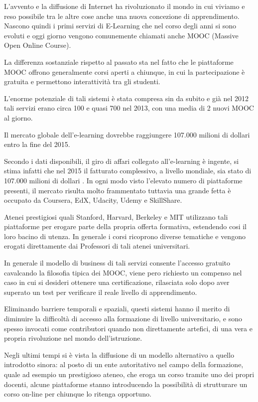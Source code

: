 L'avvento e la diffusione di Internet ha rivoluzionato il mondo in cui viviamo e reso possibile tra le altre cose anche una nuova concezione di apprendimento. Nascono quindi i primi servizi di E-Learning che nel corso degli anni si sono evoluti e oggi giorno vengono comunemente chiamati anche MOOC (Massive Open Online Course).

La differenza sostanziale rispetto al passato sta nel fatto che le piattaforme MOOC offrono generalmente corsi aperti a chiunque, in cui la partecipazione è gratuita e permettono interattività tra gli studenti.

L'enorme potenziale di tali sistemi è stata compresa sin da subito e già nel 2012 tali servizi erano circa 100 e quasi 700 nel 2013, con una media di 2 nuovi MOOC al giorno.


Il mercato globale dell'e-learning dovrebbe raggiungere 107.000 milioni di dollari entro la fine del 2015.

Secondo i dati disponibili, il giro di affari collegato all'e-learning è ingente, si stima infatti che nel 2015 il fatturato complessivo, a livello mondiale, sia stato di 107.000 milioni di dollari \cite{teleskill}. In ogni modo visto l'elevato numero di piattaforme presenti, il mercato risulta molto frammentato tuttavia una grande fetta è occupato da Coursera, EdX, Udacity, Udemy e SkillShare.

Atenei prestigiosi quali Stanford, Harvard, Berkeley e MIT utilizzano tali piattaforme per erogare parte della propria offerta formativa, estendendo cosi il loro bacino di utenza.
In generale i corsi ricoprono diverse tematiche e vengono erogati direttamente dai Professori di tali atenei universitari.

In generale il modello di business di tali servizi consente l'accesso gratuito cavalcando la filosofia tipica dei MOOC, viene pero richiesto un compenso nel caso in cui si desideri ottenere una certificazione, rilasciata solo dopo aver superato un test per verificare il reale livello di apprendimento.

Eliminando barriere temporali e spaziali, questi sistemi hanno il merito di diminuire la difficoltà di accesso alla formazione di livello universitario, e sono spesso invocati come contributori quando non direttamente artefici, di una vera e propria rivoluzione nel mondo dell'istruzione.

Negli ultimi tempi si è vista la diffusione di un modello alternativo a quello introdotto sinora: al posto di un ente autoritativo nel campo della formazione, quale ad esempio un prestigioso ateneo, che eroga un corso tramite uno dei propri docenti, alcune piattaforme stanno introducendo la possibilità di strutturare un corso on-line per chiunque lo ritenga opportuno.

